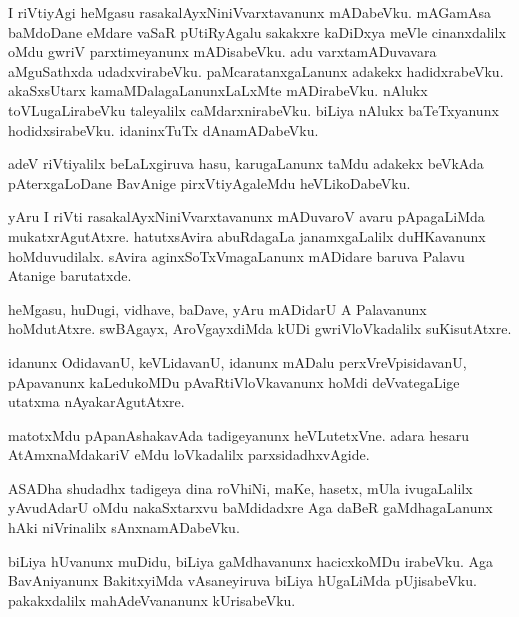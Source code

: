 \documentclass{article}
\begin{document}
\begin{mn}
I riVtiyAgi  heMgasu  rasakalAyxNiniVvarxtavanunx  mADabeVku.  mAGamAsa  baMdoDane  eMdare  
vaSaR  pUtiRyAgalu  sakakxre  kaDiDxya  meVle  cinanxdalilx  oMdu  gwriV  parxtimeyanunx  
mADisabeVku.  adu  varxtamADuvavara  aMguSathxda  udadxvirabeVku.  paMcaratanxgaLanunx  adakekx  
hadidxrabeVku.  akaSxsUtarx  kamaMDalagaLanunxLaLxMte  mADirabeVku.  nAlukx  toVLugaLirabeVku  
taleyalilx  caMdarxnirabeVku.  biLiya  nAlukx  baTeTxyanunx  hodidxsirabeVku.  idaninxTuTx  dAnamADabeVku.
\end{mn}

\begin{mn}
adeV  riVtiyalilx  beLaLxgiruva  hasu,  karugaLanunx  taMdu  adakekx  beVkAda  pAterxgaLoDane  
BavAnige  pirxVtiyAgaleMdu  heVLikoDabeVku. 
\end{mn}

\begin{mn}
yAru  I riVti  rasakalAyxNiniVvarxtavanunx  mADuvaroV  avaru  pApagaLiMda  mukatxrAgutAtxre.  
hatutxsAvira  abuRdagaLa  janamxgaLalilx  duHKavanunx  hoMduvudilalx.  sAvira  
aginxSoTxVmagaLanunx  mADidare  baruva  Palavu  Atanige  barutatxde. 
\end{mn}

\begin{mn}
heMgasu,  huDugi,  vidhave,  baDave,  yAru  mADidarU  A  Palavanunx  hoMdutAtxre.  swBAgayx,  
AroVgayxdiMda  kUDi  gwriVloVkadalilx  suKisutAtxre.
\end{mn}

\begin{mn}
idanunx  OdidavanU,  keVLidavanU,  idanunx  mADalu  perxVreVpisidavanU,  pApavanunx  
kaLedukoMDu  pAvaRtiVloVkavanunx  hoMdi  deVvategaLige  utatxma  nAyakarAgutAtxre. 
\end{mn}

\begin{mn}
matotxMdu  pApanAshakavAda  tadigeyanunx  heVLutetxVne.  adara  hesaru  AtAmxnaMdakariV  
eMdu  loVkadalilx  parxsidadhxvAgide.
\end{mn}

\begin{mn}
ASADha  shudadhx  tadigeya  dina  roVhiNi,  maKe,  hasetx,  mUla  ivugaLalilx  yAvudAdarU  
oMdu  nakaSxtarxvu  baMdidadxre  Aga  daBeR  gaMdhagaLanunx  hAki  niVrinalilx  sAnxnamADabeVku.
\end{mn}

\begin{mn}
biLiya  hUvanunx  muDidu,  biLiya  gaMdhavanunx  hacicxkoMDu  irabeVku.  Aga  BavAniyanunx  
BakitxyiMda  vAsaneyiruva  biLiya  hUgaLiMda  pUjisabeVku.  pakakxdalilx  mahAdeVvananunx  kUrisabeVku.
\end{mn}
\end{document}
